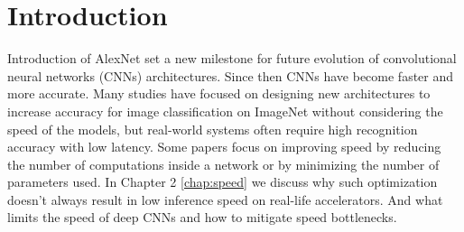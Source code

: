 

\chapter{Introduction}







Introduction of  AlexNet \cite{krizhevsky2012_imagenet_alexnet} set a new milestone for future evolution of convolutional neural networks (CNNs) architectures. Since then CNNs have become faster and more accurate. Many studies have focused on designing new architectures to increase accuracy for image classification on ImageNet without considering the speed of the models, but real-world systems often require high recognition accuracy with low latency. Some papers focus on improving speed by reducing the number of computations inside a network or by minimizing the number of parameters used. In Chapter 2 \ref{chap:speed} we discuss why such optimization doesn't always result in low inference speed on real-life accelerators. And what limits the speed of deep CNNs and how to mitigate speed bottlenecks.

